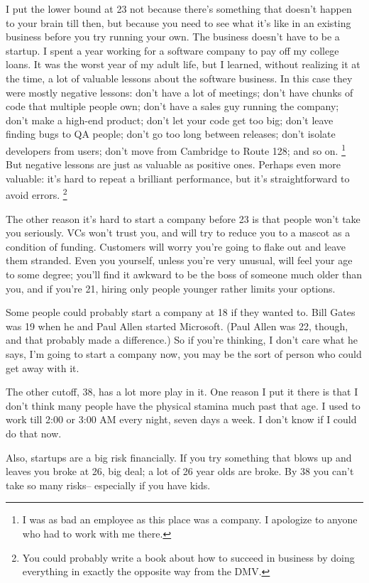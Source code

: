 \documentclass[12pt]{book}
\begin{document}
I put the lower bound at 23 not because there's something that doesn't
happen to your brain till then, but because you need to see what it's
like in an existing business before you try running your own. The
business doesn't have to be a startup. I spent a year working for a
software company to pay off my college loans. It was the worst year of
my adult life, but I learned, without realizing it at the time, a lot of
valuable lessons about the software business. In this case they were
mostly negative lessons: don't have a lot of meetings; don't have chunks
of code that multiple people own; don't have a sales guy running the
company; don't make a high-end product; don't let your code get too big;
don't leave finding bugs to QA people; don't go too long between
releases; don't isolate developers from users; don't move from Cambridge
to Route 128; and so on. \footnote{I was as bad an employee as this place was a company. I
apologize to anyone who had to work with me there.} But negative lessons are just as
valuable as positive ones. Perhaps even more valuable: it's hard to
repeat a brilliant performance, but it's straightforward to avoid
errors. \footnote{You could probably write a book about how to succeed in business
by doing everything in exactly the opposite way from the DMV.}

The other reason it's hard to start a company before 23 is that people
won't take you seriously. VCs won't trust you, and will try to reduce
you to a mascot as a condition of funding. Customers will worry you're
going to flake out and leave them stranded. Even you yourself, unless
you're very unusual, will feel your age to some degree; you'll find it
awkward to be the boss of someone much older than you, and if you're 21,
hiring only people younger rather limits your options.

Some people could probably start a company at 18 if they wanted to. Bill
Gates was 19 when he and Paul Allen started Microsoft. (Paul Allen was
22, though, and that probably made a difference.) So if you're thinking,
I don't care what he says, I'm going to start a company now, you may be
the sort of person who could get away with it.

The other cutoff, 38, has a lot more play in it. One reason I put it
there is that I don't think many people have the physical stamina much
past that age. I used to work till 2:00 or 3:00 AM every night, seven
days a week. I don't know if I could do that now.

Also, startups are a big risk financially. If you try something that
blows up and leaves you broke at 26, big deal; a lot of 26 year olds are
broke. By 38 you can't take so many risks-- especially if you have kids.
\end{document}
